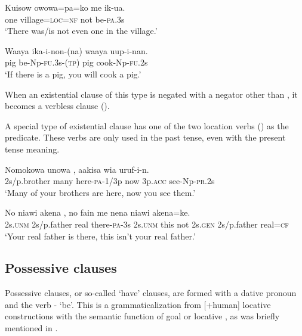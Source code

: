 \ea%
\label{ex:5:x1068}
\gll Kuisow  owowa=pa=ko  me  ik-ua. \\
     one  village=\textsc{loc}=\textsc{nf}  not  be-\textsc{pa}.3s \\
\glt `There was/is not even one in the village.'
\z

\ea%
\label{ex:5:x1067}
\gll Waaya  ika-i-non-(na)  waaya  uup-i-nan. \\
     pig  be-Np-\textsc{fu}.3s-(\textsc{tp})  pig  cook-Np-\textsc{fu}.2s \\
\glt `If there is a pig, you will cook a pig.'
\z

When an existential clause of this type is negated with a negator other than , it becomes a verbless clause ().

A special type of existential clause has one of the two location verbs () as the predicate. These verbs are only used in the past tense, even with the present tense meaning.

\ea%
\label{ex:5:x1154}
\gll Nomokowa  unowa  ,  aakisa  wia  uruf-i-n.  \\
     2s/p.brother  many  here-\textsc{pa}-1/3p  now  3p.\textsc{acc}  see-Np-\textsc{pr}.2s \\
\glt `Many of your brothers are here, now you see them.'
\z

\ea%
\label{ex:5:x1155}
\gll No  niawi  akena  ,  no  fain me  nena  niawi  akena=ke. \\
     2s.\textsc{unm}  2s/p.father  real  there-\textsc{pa}-3s  2s.\textsc{unm}  this not  2s.\textsc{gen}  2s/p.father  real=\textsc{cf} \\
\glt `Your real father is there, this isn't your real father.'
\z

\subsection{Possessive clauses} \label{sec:5.5.2}

Possessive clauses, or so-called `have' clauses, are formed with a dative pronoun and the verb - `be'. This is a grammaticalization from [+human] locative constructions with the semantic function of goal or locative \citep[50--61]{Heine1997}, as was briefly mentioned in .  

